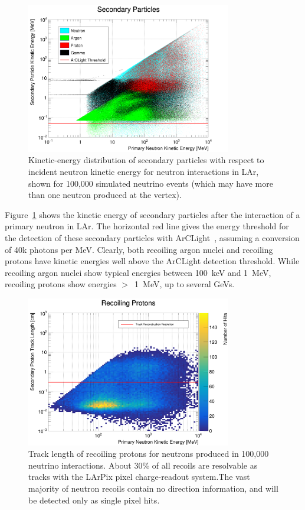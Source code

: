 \begin{figure}[htbp]
  \centering
  \includegraphics[width=0.8\textwidth]{plots/primary_neutron_recoils.png}
  \caption{Kinetic-energy distribution of secondary particles with respect to incident neutron kinetic energy for neutron interactions in LAr, shown for 100,000 simulated neutrino events (which may have more than one neutron produced at the vertex).}
  \label{fig:neutron_recoils}
\end{figure}
Figure~\ref{fig:neutron_recoils} shows the kinetic energy of secondary particles after the interaction of a primary neutron in LAr. The horizontal red line gives the energy threshold for the detection of these secondary particles with ArCLight~\cite{arclight}, assuming a conversion of 40k photons per MeV. Clearly, both recoiling argon nuclei and recoiling protons have kinetic energies well above the ArCLight detection threshold. While recoiling argon nuclei show typical energies between 100~keV and 1~MeV, recoiling protons show energies $>$~1~MeV, up to several GeVs.

\begin{figure}[htbp]
  \centering
  \includegraphics[width=0.8\textwidth]{plots/proton_track_length.png}
  \caption{Track length of recoiling protons for neutrons produced in 100,000 neutrino interactions. About 30\% of all recoils are resolvable as tracks with the LArPix pixel charge-readout system.The vast majority of neutron recoils contain no direction information, and will be detected only as single pixel hits.}
  \label{fig:proton_length}
\end{figure}

